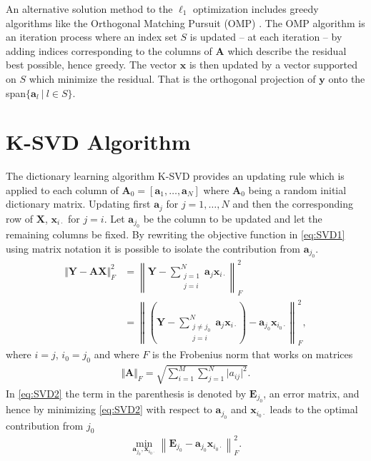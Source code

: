 An alternative solution method to the $\ell_1$ optimization includes greedy algorithms like the Orthogonal Matching Pursuit (OMP) \cite[P. 65]{FR}. 
The OMP algorithm is an iteration process where an index set $S$ is updated -- at each iteration -- by adding indices corresponding to the columns of $\mathbf{A}$ which describe the residual best possible, hence greedy.
The vector $\mathbf{x}$ is then updated by a vector supported on $S$ which minimize the residual. That is the orthogonal projection of $\mathbf{y}$ onto the span$\lbrace \mathbf{a}_l \ \vert \ l \in S \rbrace$.

\section{K-SVD Algorithm}\label{app_sec:K-SVD_alg}
The dictionary learning algorithm K-SVD provides an updating rule which is applied to each column of $\mathbf{A}_0 = \left[ \mathbf{a}_1, \dots, \mathbf{a}_N \right] $ where $\mathbf{A}_0$ being a random initial dictionary matrix. Updating first $\mathbf{a}_j$ for $j=1, \dots, N$ and then the corresponding row of $\mathbf{X}$, $\mathbf{x}_{i\cdot}$ for $j=i$.
Let $\mathbf{a}_{j_{0}}$ be the column to be updated and let the remaining columns be fixed. By rewriting the objective function in \eqref{eq:SVD1} using matrix notation it is possible to isolate the contribution from $\mathbf{a}_{j_{0}}$.
\begin{align}\label{eq:SVD2} 
\Vert \mathbf{Y} - \mathbf{AX} \Vert_{F}^{2} 
&= \left\| \mathbf{Y} - \sum_{\substack{j=1 \\ j = i}}^{N} \mathbf{a}_j \mathbf{x}_{i \cdot} \right\|_{F}^{2} \nonumber \\
&= \left\| \left( \mathbf{Y}- \sum_{\substack{j \neq j_0 \\ j = i}}^{N} \mathbf{a}_j \mathbf{x}_{i \cdot} \right) - \mathbf{a}_{j_{0}} \mathbf{x}_{i_0 \cdot} \right\| _{F}^{2},
\end{align}
where $i = j$, $i_0 = j_0$ and where $F$ is the Frobenius norm that works on matrices
\begin{align*}
\Vert \mathbf{A} \Vert_F = \sqrt{\sum_{i=1}^M \sum_{j=1}^N \vert a_{ij} \vert^2}.
\end{align*} 
In \eqref{eq:SVD2} the term in the parenthesis is denoted by $\mathbf{E}_{j_0}$, an error matrix, and hence by minimizing \eqref{eq:SVD2} with respect to $\mathbf{a}_{j_0}$ and $\mathbf{x}_{i_0 \cdot}$ leads to the optimal contribution from $j_0$
\begin{align}\label{eq:SVD3}
\min_{\mathbf{a}_{j_{0}}, \mathbf{x}_{i_0 \cdot}}\left\|\mathbf{E}_{j_{0}} - \mathbf{a}_{j_{0}} \mathbf{x}_{i_0 \cdot} \right\|_{F}^{2}.
\end{align} 
